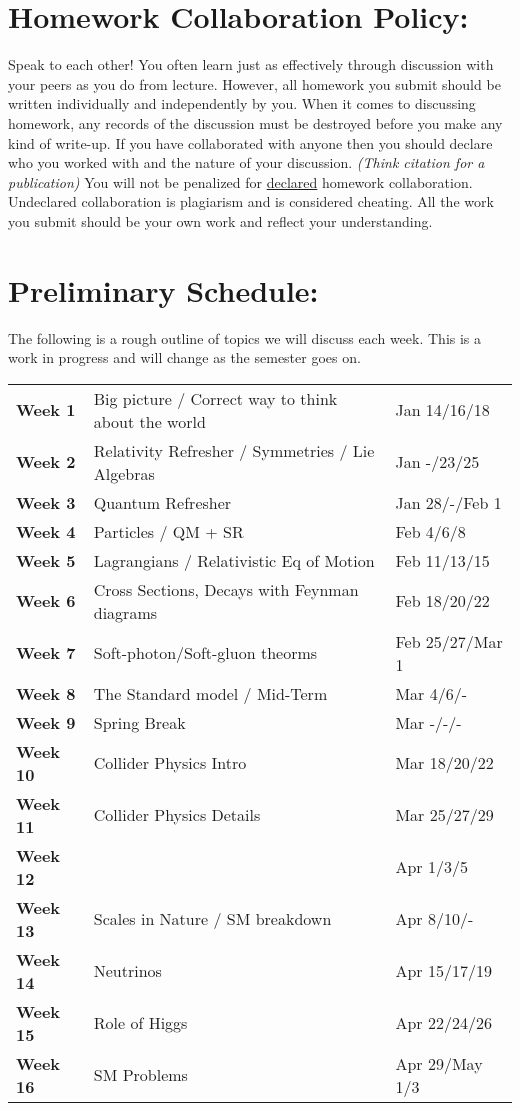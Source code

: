 \documentclass[margin,line]{res}
\begin{document}
\begin{resume}
\section{Homework Collaboration Policy:} 

Speak to each other!
You often learn just as effectively through discussion with your peers as you do from lecture. 
However, all homework you submit should be written individually and independently by you.
When it comes to discussing homework, any records of the discussion must be destroyed before you make any kind of write-up. 
If you have collaborated with anyone then you should declare who you worked with and the nature of your discussion. 
\textit{(Think citation for a publication)}
You will not be penalized for \underline{declared} homework collaboration. 
Undeclared collaboration is plagiarism and is considered cheating. 
All the work you submit should be your own work and reflect your understanding.


\section{Preliminary Schedule:}

The following is a rough outline of topics we will discuss each week. 
This is a work in progress and will change as the semester goes on.

\begin{tabular}{lll}
\textbf{Week 1}  & Big picture / Correct way to think about the world & Jan 14/16/18 \\
\textbf{Week 2}  & Relativity Refresher / Symmetries /  Lie Algebras & Jan -/23/25 \\
\textbf{Week 3}  & Quantum Refresher  & Jan 28/-/Feb 1 \\
\textbf{Week 4}  & Particles / QM + SR & Feb 4/6/8\\
\textbf{Week 5}  & Lagrangians / Relativistic Eq of Motion & Feb 11/13/15\\
\textbf{Week 6}  & Cross Sections, Decays with Feynman diagrams  & Feb 18/20/22\\
\textbf{Week 7}  & Soft-photon/Soft-gluon theorms  & Feb 25/27/Mar 1\\
\textbf{Week 8}  & The Standard model / Mid-Term & Mar 4/6/- \\
\textbf{Week 9}  & Spring Break & Mar -/-/-\\
\textbf{Week 10} & Collider Physics Intro & Mar 18/20/22 \\
\textbf{Week 11} & Collider Physics Details & Mar 25/27/29\\
\textbf{Week 12} &  & Apr 1/3/5\\
\textbf{Week 13} & Scales in Nature / SM breakdown & Apr 8/10/-\\
\textbf{Week 14} & Neutrinos & Apr 15/17/19\\
\textbf{Week 15} & Role of Higgs & Apr 22/24/26\\
\textbf{Week 16} & SM Problems  & Apr 29/May 1/3\\
\end{tabular}

\end{resume}
\end{document}
